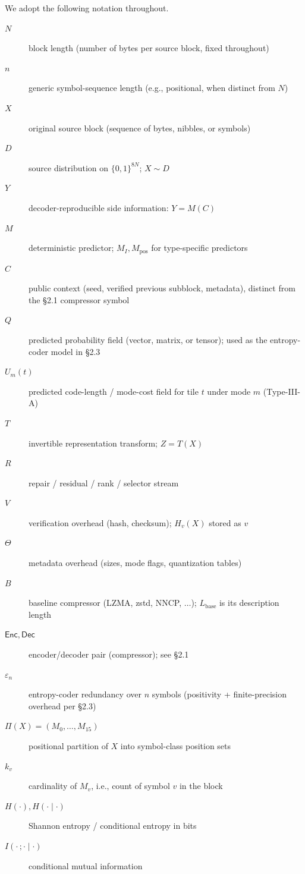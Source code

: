 \documentclass[
]{article}
\begin{document}
We adopt the following notation throughout.
\begin{description}
\item[$N$] block length (number of bytes per source block, fixed throughout)
\item[$n$] generic symbol-sequence length (e.g., positional, when distinct from $N$)
\item[$X$] original source block (sequence of bytes, nibbles, or symbols)
\item[$D$] source distribution on $\{0,1\}^{8N}$; $X \sim D$
\item[$Y$] decoder-reproducible side information: $Y = M(C)$
\item[$M$] deterministic predictor; $M_I, M_{\text{pos}}$ for type-specific predictors
\item[$C$] public context (seed, verified previous subblock, metadata), distinct from the §2.1 compressor symbol
\item[$Q$] predicted probability field (vector, matrix, or tensor); used as the entropy-coder model in §2.3
\item[$U_m(t)$] predicted code-length / mode-cost field for tile $t$ under mode $m$ (Type-III-A)
\item[$T$] invertible representation transform; $Z = T(X)$
\item[$R$] repair / residual / rank / selector stream
\item[$V$] verification overhead (hash, checksum); $H_v(X)$ stored as $v$
\item[$\Theta$] metadata overhead (sizes, mode flags, quantization tables)
\item[$B$] baseline compressor (LZMA, zstd, NNCP, $\ldots$); $L_{\text{base}}$ is its description length
\item[$\mathsf{Enc}, \mathsf{Dec}$] encoder/decoder pair (compressor); see §2.1
\item[$\varepsilon_n$] entropy-coder redundancy over $n$ symbols (positivity + finite-precision overhead per §2.3)
\item[$\Pi(X) = (M_0, \ldots, M_{15})$] positional partition of $X$ into symbol-class position sets
\item[$k_v$] cardinality of $M_v$, i.e., count of symbol $v$ in the block
\item[$H(\cdot), H(\cdot \mid \cdot)$] Shannon entropy / conditional entropy in bits
\item[$I(\cdot\,;\cdot \mid \cdot)$] conditional mutual information
\end{description}
\end{document}
